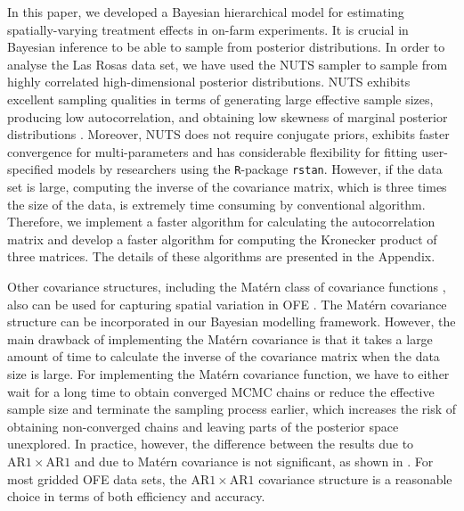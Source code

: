 \documentclass[a4paper]{article}   	%
\newcommand{\R}{\texttt{R}}
\newcommand{\rstan}{\texttt{rstan}}
\newcommand{\AR}{\mathrm{AR}1}
\newcommand{\Matern}{Mat\'ern }
\begin{document}
	In this paper, we developed a Bayesian hierarchical model for estimating spatially-varying treatment effects in on-farm experiments. It is crucial in Bayesian inference to be able to sample from posterior distributions. In order to analyse the Las Rosas data set, we have used the NUTS sampler to sample from highly correlated high-dimensional posterior distributions. NUTS exhibits excellent sampling qualities in terms of generating large effective sample sizes, producing low autocorrelation, and obtaining low skewness of marginal posterior distributions \parencite{Nishio2019Performance}. Moreover, NUTS does not require conjugate priors, exhibits faster convergence for multi-parameters and has considerable flexibility for fitting user-specified models by researchers using the \R-package \rstan. However, if the data set is large, computing the inverse of the covariance matrix, which is three times the size of the data, is extremely time consuming by conventional algorithm. Therefore, we implement a faster algorithm for calculating the autocorrelation matrix and develop a faster algorithm for computing the Kronecker product of three matrices. The details of these algorithms are presented in the Appendix. 
	
	
	
	Other covariance structures, including the \Matern class of covariance functions \parencite{Cressie1999Classes}, also can be used for capturing spatial variation in OFE \parencite{Selle2019Flexible}. The \Matern covariance structure can be incorporated in our Bayesian modelling framework. %
	However, the main drawback of implementing the \Matern covariance is that it takes a large amount of time to calculate the inverse of the covariance matrix when the data size is large. For implementing the \Matern covariance function, we have to either wait for a long time to obtain converged MCMC chains or reduce the effective sample size and terminate the sampling process earlier, which increases the risk of obtaining non-converged chains and leaving parts of the posterior space unexplored. In practice, however, the difference between the results due to $\AR\times\AR$ and due to \Matern covariance is not significant, as shown in \parencite{Selle2019Flexible}. For most gridded OFE data sets, the $\AR\times\AR$ covariance structure is a reasonable choice in terms of both efficiency and accuracy. 
	
\end{document}
